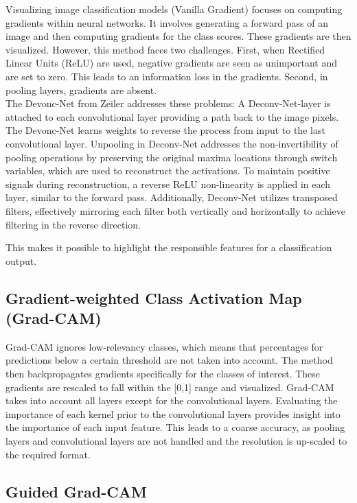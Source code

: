 Visualizing image classification models (Vanilla Gradient) \cite{simonyan2014deep} focuses on computing gradients within neural networks. It involves generating a forward pass of an image and then computing gradients for the class scores. These gradients are then visualized. However, this method faces two challenges. First, when Rectified Linear Units (ReLU) are used, negative gradients are seen as unimportant and are set to zero. This leads to an information loss in the gradients. Second, in pooling layers, gradients are absent.
\\
The Devonc-Net from Zeiler \cite{zeiler2013visualizing} addresses these problems:
A Deconv-Net-layer \cite{Zeiler2011AdaptiveDN} is attached to each convolutional layer providing a path back to the image pixels. The Devonc-Net learns weights to reverse the process from input to the last convolutional layer. Unpooling in Deconv-Net addresses the non-invertibility of pooling operations by preserving the original maxima locations through switch variables, which are used to reconstruct the activations. To maintain positive signals during reconstruction, a reverse ReLU non-linearity is applied in each layer, similar to the forward pass. Additionally, Deconv-Net utilizes transposed filters, effectively mirroring each filter both vertically and horizontally to achieve filtering in the reverse direction.

This makes it possible to highlight the responsible features for a classification output.

\subsection{Gradient-weighted Class Activation Map (Grad-CAM)}

Grad-CAM \cite{springenberg2015striving} ignores low-relevancy classes, which means that percentages for predictions below a certain threshold are not taken into account. The method then backpropagates gradients specifically for the classes of interest. These gradients are rescaled to fall within the [0,1] range and visualized. Grad-CAM takes into account all layers except for the convolutional layers. Evaluating the importance of each kernel prior to the convolutional layers provides insight into the importance of each input feature. This leads to a coarse accuracy, as pooling layers and convolutional layers are not handled and the resolution is up-scaled to the required format.

\subsection{Guided Grad-CAM}

